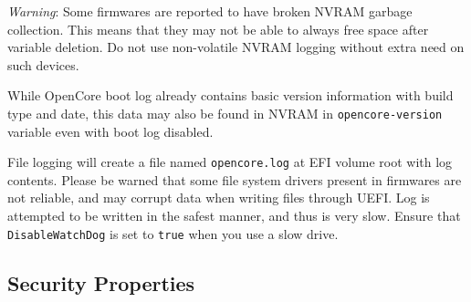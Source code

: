 \documentclass[]{article}
\makeatletter
\renewcommand{\label}[1]{%
\zref@wrapper@immediate{\oldlabel{#1}}}  %
\makeatother
\begin{document}
\begin{enumerate}
  \emph{Warning}: Some firmwares are reported to have broken NVRAM garbage collection.
  This means that they may not be able to always free space after variable deletion.
  Do not use non-volatile NVRAM logging without extra need on such devices.

  While OpenCore boot log already contains basic version information with build type and
  date, this data may also be found in NVRAM in \texttt{opencore-version} variable
  even with boot log disabled.

  File logging will create a file named \texttt{opencore.log} at EFI volume root with
  log contents. Please be warned that some file system drivers present in firmwares are
  not reliable, and may corrupt data when writing files through UEFI. Log is attempted
  to be written in the safest manner, and thus is very slow. Ensure that
  \texttt{DisableWatchDog} is set to \texttt{true} when you use a slow drive.

\end{enumerate}

\subsection{Security Properties}\label{miscsecurityprops}
\end{document}
